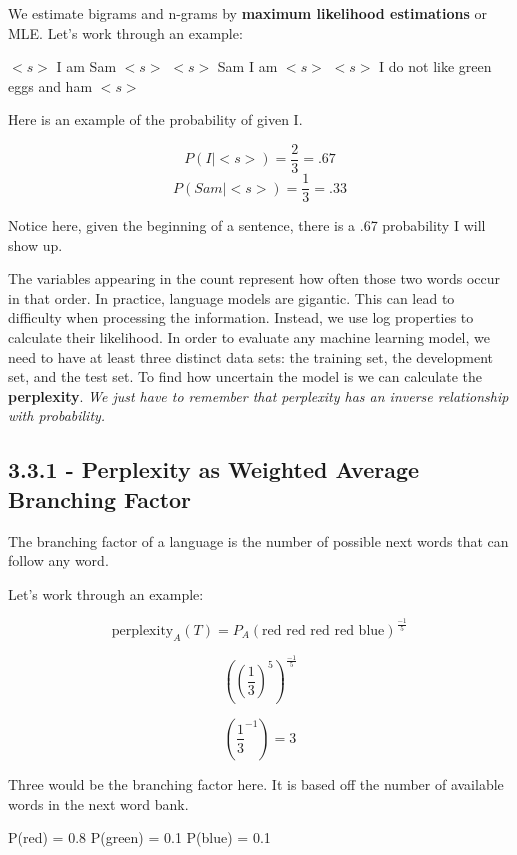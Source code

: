 \documentclass{article}
\begin{document}
We estimate bigrams and n-grams by \textbf{maximum likelihood estimations} or MLE.
Let's work through an example: \newline

$<s>$ I am Sam $<s>$ \newline
$<s>$ Sam I am $<s>$ \newline
$<s>$ I do not like green eggs and ham $<s>$ \newline

Here is an example of the probability of given I.

\[
    P(I\mid<s>) = \frac{2}{3} = .67
\]
\[
    P(Sam\mid<s>) = \frac{1}{3} = .33
\]

Notice here, given the beginning of a sentence, there is a .67 probability I will show up.

The variables appearing in the count represent how often those two words occur in that order.
In practice, language models are gigantic. This can lead to difficulty when processing the information.
Instead, we use log properties to calculate their likelihood. In order to evaluate any machine learning model,
we need to have at least three distinct data sets: the training set, the development set, and the test set.
To find how uncertain the model is we can calculate the \textbf{perplexity}. \textit{We just have to remember that perplexity has an inverse relationship with probability.}

\subsection{3.3.1 - Perplexity as Weighted Average Branching Factor}

The branching factor of a language is the number of
possible next words that can follow any word. \newline

Let's work through an example:

\[
    \text{perplexity}_{A}(T) = P_A(\text{red red red red blue})^{\frac{-1}{5}}
\]


\[
    {((\frac{1}{3})^{5})}^{\frac{-1}{5}}
\]

\[
    (\frac{1}{3}^{-1}) = 3
\]

Three would be the branching factor here. It is based off the number of available words in the next word bank. \newline

P(red) = 0.8 P(green) = 0.1 P(blue) = 0.1 \newline
\end{document}
